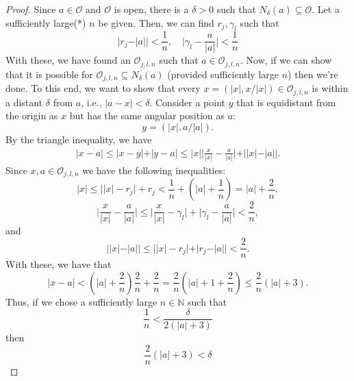 \documentclass[11pt]{article}
\theoremstyle{theorem}
\begin{document}
\begin{proof}
Since $a\in \mathcal{O}$ and $\mathcal{O}$ is open, there is a $\delta > 0$ such that $N_\delta(a) \subseteq \mathcal{O}$. Let a sufficiently large(*) $n$ be given. Then, we can find $r_j, \gamma_l$ such that 
\begin{equation*}
    \vert r_j - \vert a \vert\vert < \frac{1}{n}, \quad \bigg\vert \gamma_l - \frac{a}{\vert a\vert}\bigg\vert < \frac{1}{n} 
\end{equation*}
With these, we have found an $\mathcal{O}_{j,l,n}$ such that $a\in \mathcal{O}_{j,l,n}$. Now, if we can show that it is possible for $\mathcal{O}_{j,l,n} \subseteq N_\delta(a)$ (provided sufficiently large $n$) then we're done. To this end, we want to show that every $x = (\vert x \vert, x/\vert x \vert)\in \mathcal{O}_{j,l,n}$ is within a distant $\delta$ from $a$, i.e., $\vert a - x \vert < \delta$. Consider a point $y$ that is equidistant from the origin as $x$ but has the same angular position as $a$:
\begin{equation*}
    y = (\vert x \vert, a/\vert a\vert).
\end{equation*}
By the triangle inequality, we have
\begin{eqnarray*}
    \vert x-a \vert \leq \vert x-y\vert + \vert y-a\vert \leq \vert x \vert \bigg\vert \frac{x}{\vert x \vert} - \frac{a}{\vert a \vert} \bigg\vert + \vert \vert x \vert - \vert a \vert \vert.
\end{eqnarray*}
Since $x,a\in \mathcal{O}_{j,l,n}$ we have the following inequalities:
\begin{equation*}
    \vert x \vert \leq \vert \vert x \vert- r_j \vert + r_j < \frac{1}{n} + \left(\vert a \vert + \frac{1}{n}\right) = \vert a \vert + \frac{2}{n},
\end{equation*}
\begin{equation*}
    \bigg\vert \frac{x}{\vert x \vert} - \frac{a}{\vert a \vert} \bigg\vert \leq \bigg\vert \frac{x}{\vert x \vert} - \gamma_l \bigg\vert + \bigg\vert \gamma_l - \frac{a}{\vert a \vert} \bigg\vert < \frac{2}{n},
\end{equation*}
and
\begin{equation*}
    \vert \vert x \vert - \vert a \vert \vert \leq \vert \vert x \vert - r_j \vert + \vert r_j -  \vert a \vert \vert < \frac{2}{n}.
\end{equation*}
With these, we have that
\begin{equation*}
    \vert x - a\vert < \left( \vert a \vert + \frac{2}{n} \right) \frac{2}{n}+ \frac{2}{n} = \frac{2}{n}\left( \vert a \vert + 1 + \frac{2}{n} \right) \leq \frac{2}{n}\left( \vert a \vert + 3 \right).
\end{equation*}
Thus, if we chose a sufficiently large $n\in \mathbb{N}$ such that
\begin{equation*}
    \frac{1}{n} < \frac{\delta}{2(\vert a \vert + 3)}
\end{equation*}
then 
\begin{equation*}
    \frac{2}{n}\left( \vert a \vert + 3 \right) < \delta
\end{equation*}


\end{proof}
\end{document}
